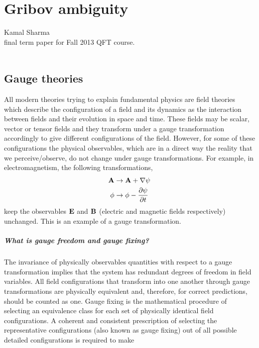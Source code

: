 
\chapter{Gribov ambiguity}
\label{c-dailyBlogKS}

\noindent
Kamal Sharma\\final term paper for Fall 2013 QFT course.
\\\\


\section{Gauge theories}
All modern theories trying to explain fundamental physics are field theories which describe the configuration of a field and its dynamics as the interaction between fields and their evolution in space and time. These fields may be scalar, vector or tensor fields and they transform under a gauge transformation accordingly to give different configurations of the field. However, for some of these configurations the physical observables, which are in a direct way the reality that we perceive/observe, do not change under gauge transformations. For example, in electromagnetism, the following transformations,
\begin{subequations}\begin{align}
 \bold{A} &\rightarrow \bold{A} + \nabla \psi  \\
 \phi &\rightarrow \phi - \frac{\partial \psi}{\partial t}\end{align} \end{subequations}
keep the observables $\bold{E}$ and $\bold{B}$ (electric and magnetic
fields respectively) unchanged. This is an example of a gauge
transformation.

\paragraph{What is gauge freedom and gauge fixing?}
The invariance of physically observables quantities with respect to a
gauge transformation implies that the system has redundant degrees of
freedom in field variables. All field configurations that transform into
one another through gauge transformations are physically equivalent and,
therefore, for correct predictions, should be counted as one. Gauge
fixing is the mathematical procedure of selecting an equivalence class
for each set of physically identical field configurations. A coherent and
consistent prescription of selecting the representative configurations
(also known as gauge fixing) out of all possible detailed configurations
is required to make


